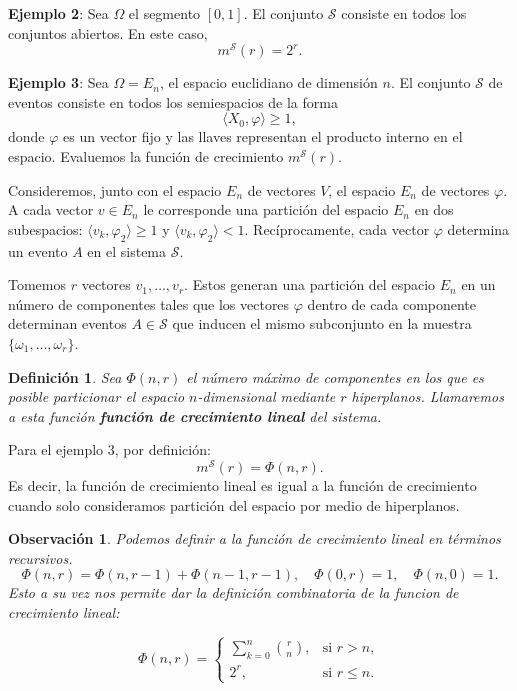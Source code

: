 \documentclass{report}
\newtheorem{dfn}{Definición}[section]
\newtheorem{obs}{Observación}[section]
\begin{document}
\textbf{Ejemplo 2}: Sea \( \Omega \) el segmento \([0,1]\). El conjunto \( \mathcal{S} \) 
consiste en todos los conjuntos abiertos. En este caso,  
\[
m^{\mathcal{S}}(r) = 2^r.
\]

\textbf{Ejemplo 3}: Sea \( \Omega = E_n \), el espacio euclidiano de dimensión \( n \). 
El conjunto \( \mathcal{S} \) de eventos consiste en todos los semiespacios de la forma  
\[
\langle X_0, \varphi \rangle \geq 1,
\]  
donde \( \varphi \) es un vector fijo y las llaves representan el producto interno en el espacio.
 Evaluemos la función de crecimiento \( m^{\mathcal{S}}(r) \).\newline

Consideremos, junto con el espacio \( E_n \) de vectores \( V \), el espacio \( E_n \) 
de vectores \( \varphi \). A cada vector \( v \in E_n \) le corresponde una partición 
del espacio \( E_n \) en dos subespacios: \(\langle v_k, \varphi_2 \rangle \geq 1\) y \(\langle v_k, \varphi_2 \rangle < 1\). 
Recíprocamente, cada vector \(\varphi\) determina un evento $A$ en el sistema \(\mathcal{S}\).\newline

Tomemos \( r \) vectores \( v_1, \dots, v_r \). Estos generan una partición del espacio \( E_n \) 
en un número de componentes tales que los vectores \( \varphi \) dentro de cada componente determinan eventos 
\( A \in \mathcal{S} \) que inducen el mismo subconjunto en la muestra \( \{\omega_1, \dots, \omega_r \}\).\newline

\begin{dfn}
    Sea \( \Phi(n, r) \) el número máximo de componentes en los que es posible particionar el espacio \( n \)-dimensional 
mediante \( r \) hiperplanos. Llamaremos a esta función \textbf{función de crecimiento lineal} del sistema.
\end{dfn}


Para el ejemplo 3, por definición:
\[
    m^{\mathcal{S}}(r) = \Phi(n, r).
\]
Es decir, la función de crecimiento lineal es igual a la función de crecimiento cuando solo consideramos partición
del espacio por medio de hiperplanos.

\begin{obs}
Podemos definir a la función de crecimiento lineal en términos recursivos. 
\[
    \Phi(n, r) = \Phi(n, r - 1) + \Phi(n - 1, r - 1),\quad \Phi(0, r) = 1, \quad \Phi(n, 0) = 1.
\]
Esto a su vez nos permite dar la definición combinatoria de la funcion de crecimiento lineal:

\begin{equation}
\Phi(n, r) =
\begin{cases}
\sum\limits_{k=0}^{n} \binom{r}{n}, & \text{si } r > n, \\
2^r, & \text{si } r \leq n.
\end{cases}
\label{def: combinatoria función crecimiento lineal}
\end{equation}
\end{obs}
\end{document}
